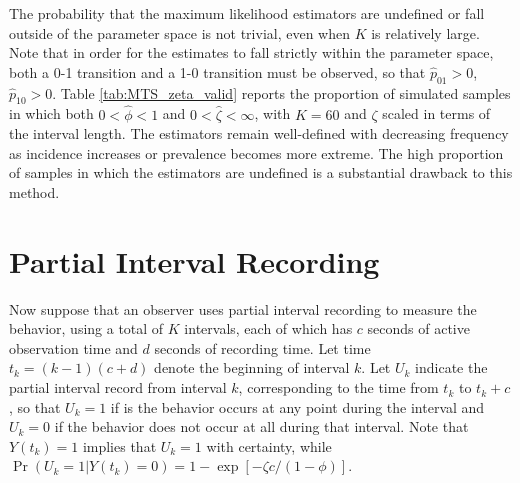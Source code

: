\documentclass[man, noextraspace, floatsintext]{apa6}\usepackage[]{graphicx}\usepackage[]{color}
\begin{document}
The probability that the maximum likelihood estimators are undefined or fall outside of the parameter space is not trivial, even when $K$ is relatively large. Note that in order for the estimates to fall strictly within the parameter space, both a 0-1 transition and a 1-0 transition must be observed, so that $\hat{p}_{01} > 0$, $\hat{p}_{10} > 0$. Table \ref{tab:MTS_zeta_valid} reports the proportion of simulated samples in which both $0 < \hat\phi < 1$ and $0 < \hat\zeta < \infty$, with $K = 60$ and $\zeta$ scaled in terms of the interval length. The estimators remain well-defined with decreasing frequency as incidence increases or prevalence becomes more extreme. The high proportion of samples in which the estimators are undefined is a substantial drawback to this method.

\section{Partial Interval Recording}
\label{sec:PIR}

Now suppose that an observer uses partial interval recording to measure the behavior, using a total of $K$ intervals, each of which has $c$ seconds of active observation time and $d$ seconds of recording time. Let time $t_k = (k-1)(c + d)$ denote the beginning of interval $k$. Let $U_k$ indicate the partial interval record from interval $k$, corresponding to the time from $t_k$ to $t_k + c$, so that $U_k = 1$ if is the behavior occurs at any point during the interval and $U_k = 0$ if the behavior does not occur at all during that interval. Note that $Y(t_k) = 1$ implies that $U_k = 1$ with certainty, while $\Pr\left(U_k = 1\left| Y(t_k) = 0\right.\right) = 1 - \exp\left[ -\zeta c / (1 - \phi)\right]$.
\end{document}
